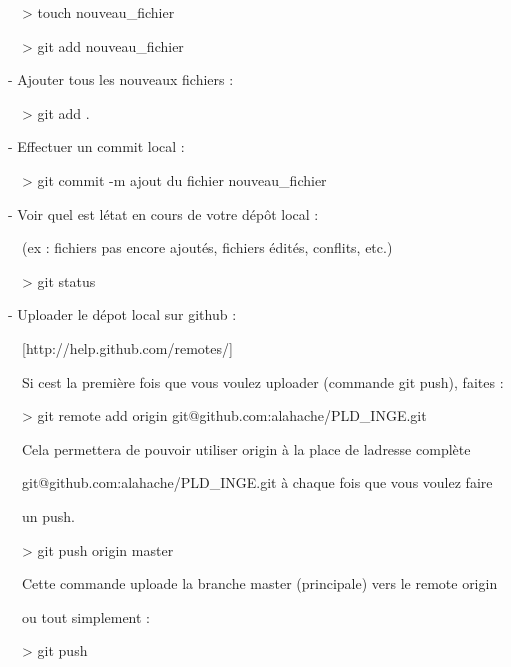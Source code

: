 \documentclass{article}
\begin{document}
\ \ {\textgreater} touch nouveau\_fichier

\ \ {\textgreater} git add nouveau\_fichier


\bigskip


\bigskip

{}- Ajouter tous les nouveaux fichiers :

\ \ {\textgreater} git add .


\bigskip


\bigskip

{}- Effectuer un commit local :

\ \ {\textgreater} git commit -m {\textquotedbl}ajout du fichier
nouveau\_fichier{\textquotedbl}


\bigskip


\bigskip

{}- Voir quel est l{\textquotesingle}état en cours de votre dépôt local
:

\ \ (ex : fichiers pas encore ajoutés, fichiers édités, conflits, etc.)

\ \ {\textgreater} git status


\bigskip


\bigskip

{}- Uploader le dépot local sur github :

\ \ [http://help.github.com/remotes/]

\ \ Si c{\textquotesingle}est la première fois que vous voulez uploader
(commande git push), faites :

\ \ {\textgreater} git remote add origin
git@github.com:alahache/PLD\_INGE.git


\bigskip

\ \ Cela permettera de pouvoir utiliser
{\textquotedbl}origin{\textquotedbl} à la place de
l{\textquotesingle}adresse complète

\ \ {\textquotedbl}git@github.com:alahache/PLD\_INGE.git{\textquotedbl}
à chaque fois que vous voulez faire

\ \ un push.


\bigskip

\ \ {\textgreater} git push origin master

\ \ Cette commande uploade la branche
{\textquotedbl}master{\textquotedbl} (principale) vers le remote
{\textquotedbl}origin{\textquotedbl}


\bigskip

\ \ ou tout simplement :

\ \ {\textgreater} git push


\bigskip
\end{document}
